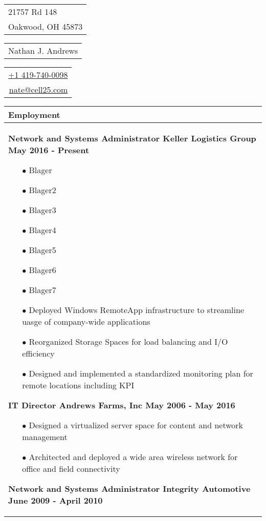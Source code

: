 \documentclass{article}
\begin{document}
\sffamily%
{\small\begin{tabular}[c]{l}
  21757 Rd 148 \\
  Oakwood, OH 45873
\end{tabular}}\hfill%
{\Large\bfseries\begin{tabular}[c]{c}
  Nathan J. Andrews
\end{tabular}}\hfill%
{\small\begin{tabular}[c]{r}
  \href{tel:14197400098}{+1 419-740-0098} \\
  \href{mailto:nate@cell25.com}{nate@cell25.com}
\end{tabular}}%

\bigskip

\begin{tabular}{p{\dimexpr\linewidth-2\tabcolsep}}
  \textbf{Employment} \\
  \hline
  {\bfseries Network and Systems Administrator \hfill Keller Logistics Group \qquad \qquad \qquad May 2016 - Present}
  \begin{itemize}
  	\item[$\bullet$]Blager
  	\item[$\bullet$]Blager2
  	\item[$\bullet$]Blager3
  	\item[$\bullet$]Blager4
  	\item[$\bullet$]Blager5
  	\item[$\bullet$]Blager6
  	\item[$\bullet$]Blager7
  	\item[$\bullet$]Deployed Windows RemoteApp infrastructure to streamline uasge of company-wide applications
  	\item[$\bullet$]Reorganized Storage Spaces for load balancing and I/O efficiency
  	\item[$\bullet$]Designed and implemented a standardized monitoring plan for remote locations including KPI
  \end{itemize}
  {\bfseries IT Director \hfill Andrews Farms, Inc \qquad \qquad \qquad May 2006 - May 2016} 
 \begin{itemize}
	\item[$\bullet$]Designed a virtualized server space for content and network management
	\item[$\bullet$]Architected and deployed a wide area wireless network for office and field connectivity
  \end{itemize}
  {\bfseries Network and Systems Administrator \qquad Integrity Automotive \hfill June 2009 - April 2010}

\end{tabular}
\end{document}
